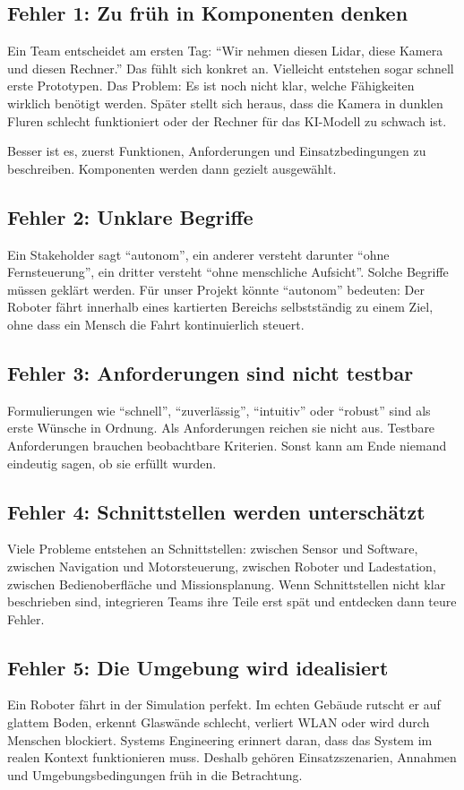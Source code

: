 \subsection{Fehler 1: Zu früh in Komponenten denken}
Ein Team entscheidet am ersten Tag: \enquote{Wir nehmen diesen Lidar, diese Kamera und diesen Rechner.} Das fühlt sich konkret an. Vielleicht entstehen sogar schnell erste Prototypen. Das Problem: Es ist noch nicht klar, welche Fähigkeiten wirklich benötigt werden. Später stellt sich heraus, dass die Kamera in dunklen Fluren schlecht funktioniert oder der Rechner für das KI-Modell zu schwach ist.

Besser ist es, zuerst Funktionen, Anforderungen und Einsatzbedingungen zu beschreiben. Komponenten werden dann gezielt ausgewählt.

\subsection{Fehler 2: Unklare Begriffe}
Ein Stakeholder sagt \enquote{autonom}, ein anderer versteht darunter \enquote{ohne Fernsteuerung}, ein dritter versteht \enquote{ohne menschliche Aufsicht}. Solche Begriffe müssen geklärt werden. Für unser Projekt könnte \enquote{autonom} bedeuten: Der Roboter fährt innerhalb eines kartierten Bereichs selbstständig zu einem Ziel, ohne dass ein Mensch die Fahrt kontinuierlich steuert.

\subsection{Fehler 3: Anforderungen sind nicht testbar}
Formulierungen wie \enquote{schnell}, \enquote{zuverlässig}, \enquote{intuitiv} oder \enquote{robust} sind als erste Wünsche in Ordnung. Als Anforderungen reichen sie nicht aus. Testbare Anforderungen brauchen beobachtbare Kriterien. Sonst kann am Ende niemand eindeutig sagen, ob sie erfüllt wurden.

\subsection{Fehler 4: Schnittstellen werden unterschätzt}
Viele Probleme entstehen an Schnittstellen: zwischen Sensor und Software, zwischen Navigation und Motorsteuerung, zwischen Roboter und Ladestation, zwischen Bedienoberfläche und Missionsplanung. Wenn Schnittstellen nicht klar beschrieben sind, integrieren Teams ihre Teile erst spät und entdecken dann teure Fehler.

\subsection{Fehler 5: Die Umgebung wird idealisiert}
Ein Roboter fährt in der Simulation perfekt. Im echten Gebäude rutscht er auf glattem Boden, erkennt Glaswände schlecht, verliert WLAN oder wird durch Menschen blockiert. Systems Engineering erinnert daran, dass das System im realen Kontext funktionieren muss. Deshalb gehören Einsatzszenarien, Annahmen und Umgebungsbedingungen früh in die Betrachtung.

